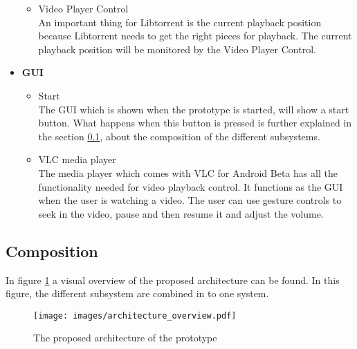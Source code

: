 \begin{itemize}
\begin{itemize}
		\item Video Player Control\\
An important thing for Libtorrent is the current playback position because Libtorrent needs to get the right pieces for playback. The current playback position will be monitored by the Video Player Control.
	\end{itemize}
\item \textbf{GUI}
	\begin{itemize}
		\item Start\\
The GUI which is shown when the prototype is started, will show a start button. What happens when this button is pressed is further explained in the section \ref{sec:comp}, about the composition of the different subsystems.
		\item VLC media player\\
The media player which comes with VLC for Android Beta has all the functionality needed for video playback control. It functions as the GUI when the user is watching a video. The user can use gesture controls to seek in the video, pause and then resume it and adjust the volume.
	\end{itemize}
\end{itemize}
\subsection{Composition}
\label{sec:comp}
In figure \ref{fig:prop_arch} a visual overview of the proposed architecture can be found. In this figure, the different subsystem are combined in to one system.
\begin{figure}[h]
	\texttt{[image: images/architecture\_overview.pdf]}
	\caption{The proposed architecture of the prototype}
	\label{fig:prop_arch}
\end{figure}

